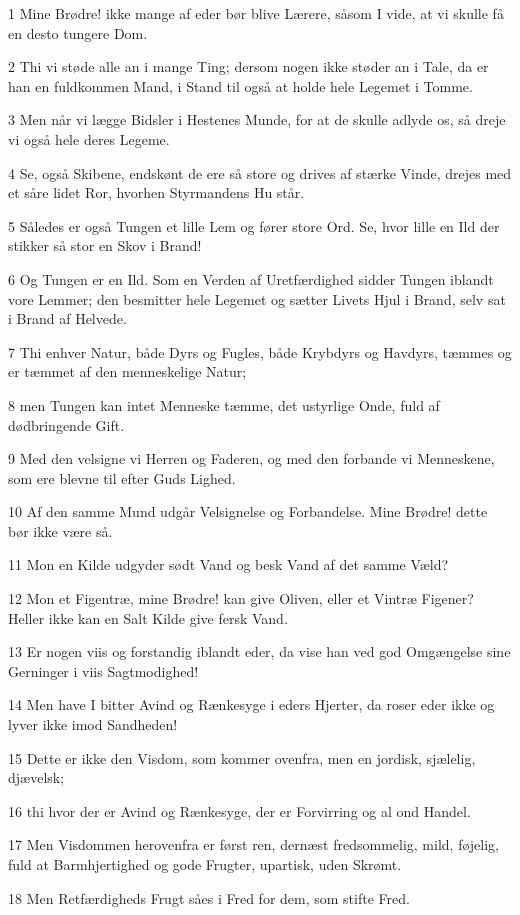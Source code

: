 \par 1 Mine Brødre! ikke mange af eder bør blive Lærere, såsom I vide, at vi skulle få en desto tungere Dom.
\par 2 Thi vi støde alle an i mange Ting; dersom nogen ikke støder an i Tale, da er han en fuldkommen Mand, i Stand til også at holde hele Legemet i Tomme.
\par 3 Men når vi lægge Bidsler i Hestenes Munde, for at de skulle adlyde os, så dreje vi også hele deres Legeme.
\par 4 Se, også Skibene, endskønt de ere så store og drives af stærke Vinde, drejes med et såre lidet Ror, hvorhen Styrmandens Hu står.
\par 5 Således er også Tungen et lille Lem og fører store Ord. Se, hvor lille en Ild der stikker så stor en Skov i Brand!
\par 6 Og Tungen er en Ild. Som en Verden af Uretfærdighed sidder Tungen iblandt vore Lemmer; den besmitter hele Legemet og sætter Livets Hjul i Brand, selv sat i Brand af Helvede.
\par 7 Thi enhver Natur, både Dyrs og Fugles, både Krybdyrs og Havdyrs, tæmmes og er tæmmet af den menneskelige Natur;
\par 8 men Tungen kan intet Menneske tæmme, det ustyrlige Onde, fuld af dødbringende Gift.
\par 9 Med den velsigne vi Herren og Faderen, og med den forbande vi Menneskene, som ere blevne til efter Guds Lighed.
\par 10 Af den samme Mund udgår Velsignelse og Forbandelse. Mine Brødre! dette bør ikke være så.
\par 11 Mon en Kilde udgyder sødt Vand og besk Vand af det samme Væld?
\par 12 Mon et Figentræ, mine Brødre! kan give Oliven, eller et Vintræ Figener? Heller ikke kan en Salt Kilde give fersk Vand.
\par 13 Er nogen viis og forstandig iblandt eder, da vise han ved god Omgængelse sine Gerninger i viis Sagtmodighed!
\par 14 Men have I bitter Avind og Rænkesyge i eders Hjerter, da roser eder ikke og lyver ikke imod Sandheden!
\par 15 Dette er ikke den Visdom, som kommer ovenfra, men en jordisk, sjælelig, djævelsk;
\par 16 thi hvor der er Avind og Rænkesyge, der er Forvirring og al ond Handel.
\par 17 Men Visdommen herovenfra er først ren, dernæst fredsommelig, mild, føjelig, fuld at Barmhjertighed og gode Frugter, upartisk, uden Skrømt.
\par 18 Men Retfærdigheds Frugt såes i Fred for dem, som stifte Fred.

